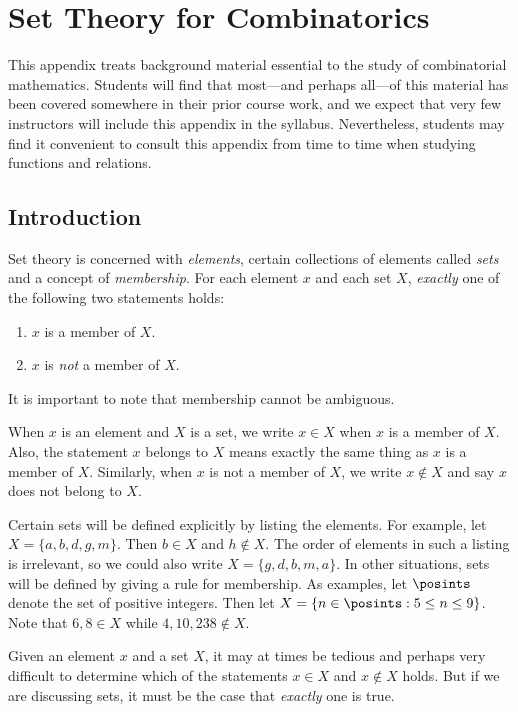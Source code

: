 
\chapter{Set Theory for Combinatorics}\label{app:settheory}

This appendix treats background material essential to the
study of combinatorial mathematics.  Students will find that
most---and perhaps all---of this material has been covered somewhere
in their prior course work, and we expect that very few instructors
will include this appendix in the syllabus.  Nevertheless, students
may find it convenient to consult this appendix from time to
time when studying functions and relations.

\section{Introduction}

Set theory is concerned with \textit{elements}, certain collections
of elements called \textit{sets} and a concept of \textit{membership}.
For each element $x$ and each set $X$, \textit{exactly} one of the 
following two statements holds:

\begin{enumerate}
\item $x$ is a member of $X$. 
\item $x$ is \textit{not} a member of $X$. 
\end{enumerate}

It is important to note that membership cannot be ambiguous.

When $x$ is an element and $X$ is a set, we write $x\in X$ when
$x$ is a member of $X$.  Also, the statement $x$ belongs to $X$ means
exactly the same thing as $x$ is a member of $X$.  Similarly, when
$x$ is not a member of $X$, we write $x\notin X$ and say $x$ does
not belong to $X$.

Certain sets will be defined explicitly by listing the elements.
For example, let $X=\{a,b,d,g,m\}$.  Then $b\in X$ and $h\notin X$.
The order of elements in such a listing is irrelevant, so we could
also write $X=\{g,d,b,m,a\}$.  In other situations, sets will be 
defined by giving a rule for membership.
As examples, let $\posints$ denote the set of positive integers.  
Then let $X=\{n\in\posints:5\le n\le 9\}$.   Note that $6,8\in X$ while
$4,10,238\notin X$.

Given an element $x$ and a set $X$, it may at times be tedious and
perhaps very difficult to determine which of the statements
$x\in X$ and $x\notin X$ holds.  But if we are discussing sets,
it must be the case that \textit{exactly} one is true.

